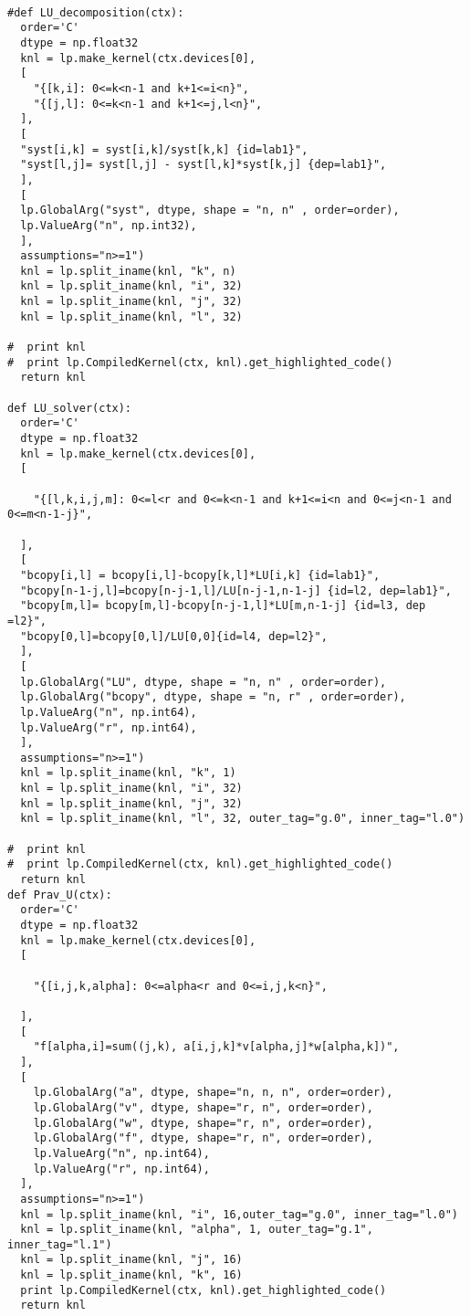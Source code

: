 \documentclass{scrartcl}
\begin{document}
\begin{verbatim}

#def LU_decomposition(ctx):
  order='C'
  dtype = np.float32
  knl = lp.make_kernel(ctx.devices[0], 
  [
    "{[k,i]: 0<=k<n-1 and k+1<=i<n}",
    "{[j,l]: 0<=k<n-1 and k+1<=j,l<n}",
  ],
  [
  "syst[i,k] = syst[i,k]/syst[k,k] {id=lab1}",
  "syst[l,j]= syst[l,j] - syst[l,k]*syst[k,j] {dep=lab1}",
  ],
  [
  lp.GlobalArg("syst", dtype, shape = "n, n" , order=order),
  lp.ValueArg("n", np.int32),
  ],
  assumptions="n>=1")
  knl = lp.split_iname(knl, "k", n)
  knl = lp.split_iname(knl, "i", 32)
  knl = lp.split_iname(knl, "j", 32)
  knl = lp.split_iname(knl, "l", 32)

#  print knl
#  print lp.CompiledKernel(ctx, knl).get_highlighted_code()   
  return knl

def LU_solver(ctx):
  order='C'
  dtype = np.float32
  knl = lp.make_kernel(ctx.devices[0], 
  [

    "{[l,k,i,j,m]: 0<=l<r and 0<=k<n-1 and k+1<=i<n and 0<=j<n-1 and 0<=m<n-1-j}",

  ],
  [
  "bcopy[i,l] = bcopy[i,l]-bcopy[k,l]*LU[i,k] {id=lab1}",
  "bcopy[n-1-j,l]=bcopy[n-j-1,l]/LU[n-j-1,n-1-j] {id=l2, dep=lab1}",
  "bcopy[m,l]= bcopy[m,l]-bcopy[n-j-1,l]*LU[m,n-1-j] {id=l3, dep =l2}",
  "bcopy[0,l]=bcopy[0,l]/LU[0,0]{id=l4, dep=l2}",
  ],
  [
  lp.GlobalArg("LU", dtype, shape = "n, n" , order=order),
  lp.GlobalArg("bcopy", dtype, shape = "n, r" , order=order),
  lp.ValueArg("n", np.int64),
  lp.ValueArg("r", np.int64),
  ],
  assumptions="n>=1")
  knl = lp.split_iname(knl, "k", 1)
  knl = lp.split_iname(knl, "i", 32)
  knl = lp.split_iname(knl, "j", 32)
  knl = lp.split_iname(knl, "l", 32, outer_tag="g.0", inner_tag="l.0")

#  print knl
#  print lp.CompiledKernel(ctx, knl).get_highlighted_code()   
  return knl
def Prav_U(ctx):
  order='C'
  dtype = np.float32
  knl = lp.make_kernel(ctx.devices[0], 
  [

    "{[i,j,k,alpha]: 0<=alpha<r and 0<=i,j,k<n}",

  ],
  [
    "f[alpha,i]=sum((j,k), a[i,j,k]*v[alpha,j]*w[alpha,k])",
  ],
  [
    lp.GlobalArg("a", dtype, shape="n, n, n", order=order),
    lp.GlobalArg("v", dtype, shape="r, n", order=order),
    lp.GlobalArg("w", dtype, shape="r, n", order=order),
    lp.GlobalArg("f", dtype, shape="r, n", order=order),
    lp.ValueArg("n", np.int64),
    lp.ValueArg("r", np.int64),
  ],
  assumptions="n>=1")
  knl = lp.split_iname(knl, "i", 16,outer_tag="g.0", inner_tag="l.0")
  knl = lp.split_iname(knl, "alpha", 1, outer_tag="g.1", inner_tag="l.1")
  knl = lp.split_iname(knl, "j", 16)
  knl = lp.split_iname(knl, "k", 16)
  print lp.CompiledKernel(ctx, knl).get_highlighted_code()   
  return knl



\end{verbatim}
\end{document}
